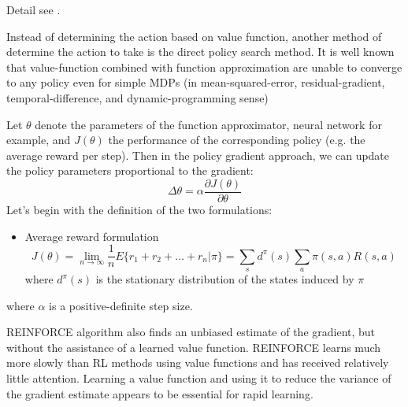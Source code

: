 \documentclass[9pt]{article}
\begin{document}
Detail see \citep{singh2000convergence}.



 Instead of determining the action based on value function, another method of determine the action to take is the direct policy search method. It is well known that value-function combined with function approximation are unable to converge to any policy even for simple MDPs (in mean-squared-error, residual-gradient, temporal-difference, and dynamic-programming sense) \lackcite 

Let \(\theta\) denote the parameters of the function approximator, neural network for example, and \(J(\theta)\) the performance of the corresponding policy (e.g. the average reward per step). Then in the policy gradient approach, we can update the policy parameters proportional to the gradient:
\[
\Delta\theta = \alpha \frac{\partial J(\theta)}{\partial \theta}
\]
Let's begin with the definition of the two formulations:
\begin{itemize}
\item Average reward formulation\\
\[
J(\theta) = \lim_{n\rightarrow \infty} \frac{1}{n} E\{r_1 + r_2 + \ldots + r_n | \pi\} = \sum_s d^{\pi}(s) \sum_a \pi(s,a) R(s,a)
\]
where \(d^{\pi}(s)\) is the stationary distribution of the states induced by \(\pi\)
\end{itemize}
where \(\alpha\) is a positive-definite step size.




 REINFORCE algorithm also finds an unbiased estimate of
the gradient, but without the assistance of a learned value function. REINFORCE
learns much more slowly than RL methods using value functions and has received
relatively little attention. Learning a value function and using it to reduce the variance
of the gradient estimate appears to be essential for rapid learning.
\end{document}
